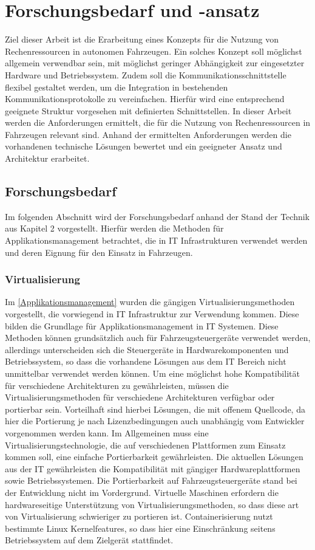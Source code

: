 \chapter{Forschungsbedarf und -ansatz}

Ziel dieser Arbeit ist die Erarbeitung eines Konzepts für die Nutzung von Rechenressourcen in autonomen Fahrzeugen. Ein solches Konzept soll möglichst allgemein verwendbar sein, mit möglichst geringer Abhängigkeit zur eingesetzter Hardware und Betriebssystem. Zudem soll die Kommunikationsschnittstelle flexibel gestaltet werden, um die Integration in bestehenden Kommunikationsprotokolle zu vereinfachen. Hierfür wird eine entsprechend geeignete Struktur vorgesehen mit definierten Schnittstellen. In dieser Arbeit werden die Anforderungen ermittelt, die für die Nutzung von Rechenressourcen in Fahrzeugen relevant sind. Anhand der ermittelten Anforderungen werden die vorhandenen technische Lösungen bewertet und ein geeigneter Ansatz und Architektur erarbeitet.

\section{Forschungsbedarf}

Im folgenden Abschnitt wird der Forschungsbedarf anhand der Stand der Technik aus Kapitel 2 vorgestellt. Hierfür werden die Methoden für Applikationsmanagement betrachtet, die in IT Infrastrukturen verwendet werden und deren Eignung für den Einsatz in Fahrzeugen. 

\subsection{Virtualisierung}
Im \autoref{Applikationsmanagement} wurden die gängigen Virtualisierungsmethoden vorgestellt, die vorwiegend in IT Infrastruktur zur Verwendung kommen. Diese bilden die Grundlage für Applikationsmanagement in IT Systemen. Diese Methoden können grundsätzlich auch für Fahrzeugsteuergeräte verwendet werden, allerdings unterscheiden sich die Steuergeräte in Hardwarekomponenten und Betriebssystem, so dass die vorhandene Lösungen aus dem IT Bereich nicht unmittelbar verwendet werden können. Um eine möglichst hohe Kompatibilität für verschiedene Architekturen zu gewährleisten, müssen die Virtualisierungsmethoden für verschiedene Architekturen verfügbar oder portierbar sein. Vorteilhaft sind hierbei Lösungen, die mit offenem Quellcode, da hier die Portierung je nach Lizenzbedingungen auch unabhängig vom Entwickler vorgenommen werden kann. Im Allgemeinen muss eine Virtualisierungstechnologie, die auf verschiedenen Plattformen zum Einsatz kommen soll, eine einfache Portierbarkeit gewährleisten. Die aktuellen Lösungen aus der IT gewährleisten die Kompatibilität mit gängiger Hardwareplattformen sowie Betriebssystemen. Die Portierbarkeit auf Fahrzeugsteuergeräte stand bei der Entwicklung nicht im Vordergrund. Virtuelle Maschinen erfordern die hardwareseitige Unterstützung von Virtualisierungsmethoden, so dass diese art von Virtualisierung schwieriger zu portieren ist. Containerisierung nutzt bestimmte Linux Kernelfeatures, so dass hier eine Einschränkung seitens Betriebssystem auf dem Zielgerät stattfindet.
